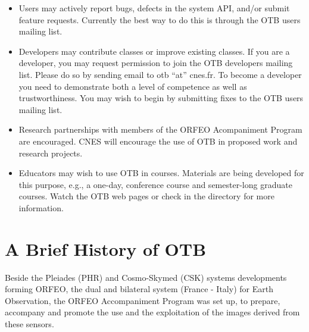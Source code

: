 \begin{itemize}
       \item Users may actively report bugs, defects in the system API,
       and/or submit feature requests. Currently the best way to do this is
       through the OTB users mailing list.

       \item Developers may contribute classes or improve existing
       classes. If you are a developer, you may request permission to join
       the OTB developers mailing list. Please do so by sending email to
       otb ``at'' cnes.fr. To become a developer you need to
       demonstrate both a level of competence as well as
       trustworthiness. You may wish to begin by submitting fixes to the OTB
       users mailing list.

       \item Research partnerships with members of the ORFEO
       Acompaniment Program are encouraged. CNES will encourage the use of
       OTB in proposed work and research projects.


       \item Educators may wish to use OTB in courses. Materials are being
       developed for this purpose, e.g., a one-day, conference course and
       semester-long graduate courses. Watch the OTB web pages or check in
       the  directory for more information.
\end{itemize}



\section{A Brief History of OTB}
\label{sec:History}



Beside the Pleiades (PHR) and Cosmo-Skymed (CSK) systems developments forming
ORFEO, the dual and bilateral system (France - Italy) for Earth Observation, the
ORFEO Accompaniment Program was set up, to prepare, accompany and promote the
use and the exploitation of the images derived from these sensors.

